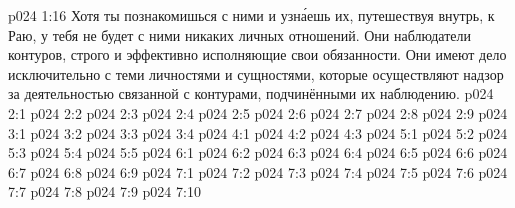 \vs p024 1:16 Хотя ты познакомишься с ними и узн\'аешь их, путешествуя внутрь, к Раю, у тебя не будет с ними никаких личных отношений. Они наблюдатели контуров, строго и эффективно исполняющие свои обязанности. Они имеют дело исключительно с теми личностями и сущностями, которые осуществляют надзор за деятельностью связанной с контурами, подчинёнными их наблюдению.
\vs p024 2:1 
\vs p024 2:2 
\vs p024 2:3 \pc 
\vs p024 2:4 
\vs p024 2:5 
\vs p024 2:6 
\vs p024 2:7 \pc 
\vs p024 2:8 
\vs p024 2:9 
\vs p024 3:1 
\vs p024 3:2 
\vs p024 3:3 
\vs p024 3:4 
\vs p024 4:1 
\vs p024 4:2 
\vs p024 4:3 
\vs p024 5:1 
\vs p024 5:2 
\vs p024 5:3 
\vs p024 5:4 
\vs p024 5:5 \pc 
{}
\vs p024 6:1 
\vs p024 6:2 
\vs p024 6:3 
\vs p024 6:4 \pc 
\vs p024 6:5 
\vs p024 6:6 
\vs p024 6:7 
\vs p024 6:8 \pc 
\vs p024 6:9 \pc 
{}
\vs p024 7:1 
\vs p024 7:2 
\vs p024 7:3 
\vs p024 7:4 \pc 
\vs p024 7:5 
\vs p024 7:6 
\vs p024 7:7 \pc 
\vs p024 7:8 \pc 
\vs p024 7:9 
\vsetoff
\vs p024 7:10 
\quizlink
